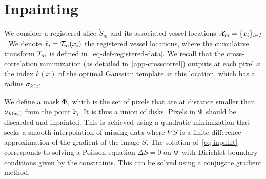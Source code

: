 
\section{Inpainting}
\label{app-inpainting}

We consider a registered slice $\tilde S_m$ and its associated vessel locations $\mathcal{X}_m = \{x_i\}_{i \in I}$. We denote $\tilde x_i = \mathcal{T}_m(x_i)$ the registered vessel locations, where the cumulative transform $\mathcal{T}_m$ is defined in~\eqref{eq-def-registered-data}. We recall that the cross-correlation minimization (as detailed in~\ref{app-crosscorrel}) outputs at each pixel $x$ the index $k(x)$ of the optimal Gaussian template at this location, which has a radius $\sigma_{k(x)}$.

We define a mask $\Phi$, which is the set of pixels that are at distance smaller than $\sigma_{k(x_i)}$ from the point $\tilde x_i$. It is thus a union of disks. Pixels in $\Phi$ should be discarded and inpainted. This is achieved using a quadratic minimization that seeks a smooth interpolation of missing data
where $\nabla S$ is a finite difference approximation of the gradient of the image $S$. The solution of~\eqref{eq-inpaint} corresponds to solving a Poisson equation $\Delta S = 0$ on $\Phi$ with Dirichlet boundary conditions given by the constraints. This can be solved using a conjugate gradient method. 

